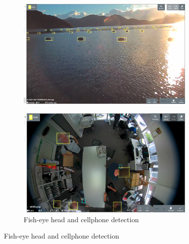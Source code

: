 \begin{figure}[h!]
\centering

\begin{subfigure}[t]{0.5\textwidth}
  \includegraphics[width=0.95\textwidth]{figures/annotation/screenshots/buoys.png}
  \caption{}
\end{subfigure}%
\begin{subfigure}[t]{0.5\textwidth}
  \includegraphics[width=0.95\textwidth]{figures/annotation/screenshots/victor.png}
  \caption{ Fish-eye head and cellphone detection }
\end{subfigure}


\end{figure}
